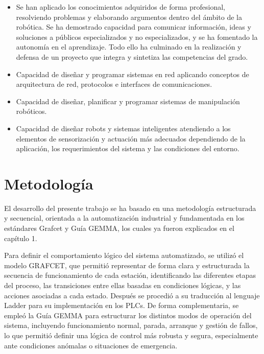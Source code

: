 \begin{itemize}
	\item Se han aplicado los conocimientos adquiridos de forma profesional, resolviendo problemas y elaborando argumentos dentro del ámbito de la robótica. Se ha demostrado capacidad para comunicar información, ideas y soluciones a públicos especializados y no especializados, y se ha fomentado la autonomía en el aprendizaje. Todo ello ha culminado en la realización y defensa de un proyecto que integra y sintetiza las competencias del grado.

	\item Capacidad de diseñar y programar sistemas en red aplicando conceptos de arquitectura de red, protocolos e interfaces de comunicaciones.

	\item Capacidad de diseñar, planificar y programar sistemas de manipulación robóticos.

	\item Capacidad de diseñar robots y sistemas inteligentes atendiendo a los elementos de sensorización y actuación más adecuados dependiendo de la aplicación, los requerimientos del sistema y las condiciones del entorno.

\end{itemize}
 
\section{Metodología}
\label{sec:metodologia}

El desarrollo del presente trabajo se ha basado en una metodología estructurada y secuencial, orientada a la automatización industrial y fundamentada en los estándares Grafcet y Guía GEMMA, los cuales ya fueron explicados en el capítulo 1.

Para definir el comportamiento lógico del sistema automatizado, se utilizó el modelo GRAFCET, que permitió representar de forma clara y estructurada la secuencia de funcionamiento de cada estación, identificando las diferentes etapas del proceso, las transiciones entre ellas basadas en condiciones lógicas, y las acciones asociadas a cada estado. Después se procedió a su traducción al lenguaje Ladder para su implementación en los PLCs. De forma complementaria, se empleó la Guía GEMMA para estructurar los distintos modos de operación del sistema, incluyendo funcionamiento normal, parada, arranque y gestión de fallos, lo que permitió definir una lógica de control más robusta y segura, especialmente ante condiciones anómalas o situaciones de emergencia.

